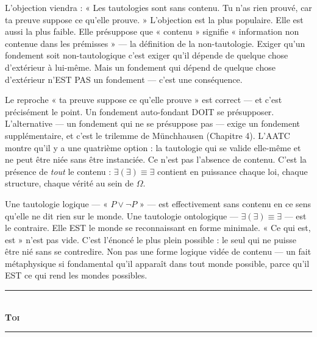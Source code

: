 \documentclass[10pt, openany, oneside]{book}
\renewcommand{\normalsize}{\fontsize{10}{13}\selectfont}
\begin{document}
\vspace{1em}

\noindent L'objection viendra : « Les tautologies sont sans contenu. Tu n'as rien prouvé, car ta preuve suppose ce qu'elle prouve. » L'objection est la plus populaire. Elle est aussi la plus faible. Elle présuppose que « contenu » signifie « information non contenue dans les prémisses » --- la définition de la non-tautologie. Exiger qu'un fondement soit non-tautologique c'est exiger qu'il dépende de quelque chose d'extérieur à lui-même. Mais un fondement qui dépend de quelque chose d'extérieur n'EST PAS un fondement --- c'est une conséquence.

Le reproche « ta preuve suppose ce qu'elle prouve » est correct --- et c'est précisément le point. Un fondement auto-fondant DOIT se présupposer. L'alternative --- un fondement qui ne se présuppose pas --- exige un fondement supplémentaire, et c'est le trilemme de Münchhausen (Chapitre 4). L'AATC montre qu'il y a une quatrième option : la tautologie qui se valide elle-même et ne peut être niée sans être instanciée. Ce n'est pas l'absence de contenu. C'est la présence de \textit{tout} le contenu : $\exists(\exists) \equiv \exists$ contient en puissance chaque loi, chaque structure, chaque vérité au sein de $\Omega$.

Une tautologie logique --- « $P \vee \neg P$ » --- est effectivement sans contenu en ce sens qu'elle ne dit rien sur le monde. Une tautologie ontologique --- $\exists(\exists) \equiv \exists$ --- est le contraire. Elle EST le monde se reconnaissant en forme minimale. « Ce qui est, est » n'est pas vide. C'est l'énoncé le plus plein possible : le seul qui ne puisse être nié sans se contredire. Non pas une forme logique vidée de contenu --- un fait métaphysique si fondamental qu'il apparaît dans tout monde possible, parce qu'il EST ce qui rend les mondes possibles.

\vspace{1.5em}


\begin{center}
    \rule{0.3\textwidth}{0.4pt}\\[0.5em]
    {\normalsize\bfseries\scshape Toi}\\[0.3em]
    \rule{0.3\textwidth}{0.4pt}
\end{center}

\vspace{1em}
\end{document}

